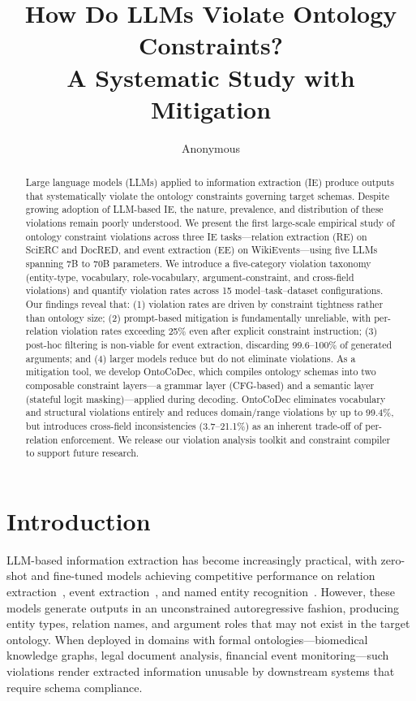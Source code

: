 \documentclass[11pt]{article}
\title{How Do LLMs Violate Ontology Constraints?\\A Systematic Study with Mitigation}
\author{Anonymous}
\date{}
\newcommand{\sys}{OntoCoDec}
\begin{document}
\maketitle

\begin{abstract}
Large language models (LLMs) applied to information extraction (IE) produce outputs that systematically violate the ontology constraints governing target schemas.
Despite growing adoption of LLM-based IE, the nature, prevalence, and distribution of these violations remain poorly understood.
We present the first large-scale empirical study of ontology constraint violations across three IE tasks---relation extraction (RE) on SciERC and DocRED, and event extraction (EE) on WikiEvents---using five LLMs spanning 7B to 70B parameters.
We introduce a five-category violation taxonomy (entity-type, vocabulary, role-vocabulary, argument-constraint, and cross-field violations) and quantify violation rates across 15 model--task--dataset configurations.
Our findings reveal that: (1) violation rates are driven by constraint tightness rather than ontology size; (2) prompt-based mitigation is fundamentally unreliable, with per-relation violation rates exceeding 25\% even after explicit constraint instruction; (3) post-hoc filtering is non-viable for event extraction, discarding 99.6--100\% of generated arguments; and (4) larger models reduce but do not eliminate violations.
As a mitigation tool, we develop \sys{}, which compiles ontology schemas into two composable constraint layers---a grammar layer (CFG-based) and a semantic layer (stateful logit masking)---applied during decoding.
\sys{} eliminates vocabulary and structural violations entirely and reduces domain/range violations by up to 99.4\%, but introduces cross-field inconsistencies (3.7--21.1\%) as an inherent trade-off of per-relation enforcement.
We release our violation analysis toolkit and constraint compiler to support future research.
\end{abstract}

\section{Introduction}
\label{sec:intro}

LLM-based information extraction has become increasingly practical, with zero-shot and fine-tuned models achieving competitive performance on relation extraction~\citep{wadhwa2023revisiting,wan2023gpt}, event extraction~\citep{gao2023exploring}, and named entity recognition~\citep{li2023evaluating}.
However, these models generate outputs in an unconstrained autoregressive fashion, producing entity types, relation names, and argument roles that may not exist in the target ontology.
When deployed in domains with formal ontologies---biomedical knowledge graphs, legal document analysis, financial event monitoring---such violations render extracted information unusable by downstream systems that require schema compliance.
\end{document}
